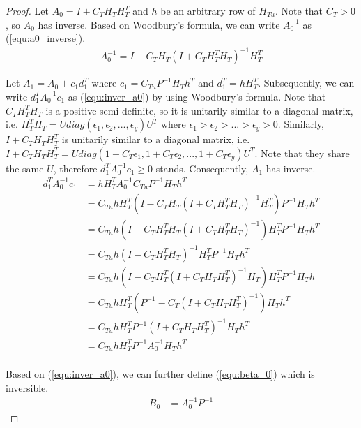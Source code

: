 \documentclass{standalone}
\begin{document}
\begin{proof}
Let $A_0=I+C_T H_T H_T^T$ and $h$ be an arbitrary row of $H_{Tu}$. Note that $C_T >0$, so $A_{0}$ has inverse. Based on Woodbury's formula, we can write $A_0^{-1}$ as (\ref{equ:a0_inverse}).
\begin{equation}
\label{equ:a0_inverse}
\begin{aligned}
A_0^{-1}=I - C_T H_T (I+ C_T H_T^T H_T)^{-1}H_T^T
\end{aligned}
\end{equation}

Let $A_1=A_0+c_1 d_1^T $ where $c_1=C_{Tu}P^{-1} H_T h^T$ and $d_1^T=h H_T^T$. Subsequently, we can write $d_1^T A_0^{-1}c_1$ as (\ref{equ:inver_a0}) by using Woodbury's formula. Note that $C_T H_T^T H_T$ is a positive semi-definite, so it is unitarily similar to a diagonal matrix, i.e. $H_T^T H_T=U diag(\epsilon_1,\epsilon_2,...,\epsilon_y) U^T$ where $\epsilon_1> \epsilon_2>...>\epsilon_y>0$. Similarly, $I+C_T H_T H_T^T$ is unitarily similar to a diagonal matrix, i.e. $I+C_T H_T H_T^T=U diag(1+C_T \epsilon_1, 1+C_T \epsilon_2,...,1+C_T \epsilon_y)U^T$. Note that they share the same $U$, therefore $d_1^T A_0^{-1}c_1 \ge 0$ stands. Consequently, $A_1$ has inverse.
\begin{equation}
\label{equ:inver_a0}
\begin{aligned}
d_1^T A_0^{-1}c_1 &= h H_T^T A_0^{-1} C_{Tu} P^{-1}H_T h^T \\
&=C_{Tu} h H_T^T (I- C_T H_T (I+ C_T H_T^T H_T)^{-1} H_T^T)  P^{-1} H_T h^T \\
&=C_{Tu} h(I-C_T H_T^T H_T (I+ C_T H_T^T H_T)^{-1})H_T^T P^{-1}H_T h^T \\
&=C_{Tu} h (I-C_T H_T^T H_T)^{-1} H_T^T P^{-1}H_T h^T \\
&=C_{Tu} h (I-C_T H_T^T (I+C_T H_T H_T^T)^{-1} H_T)H_T^T P^{-1} H_T h \\
&=C_{Tu} h H_T^T (P^{-1}-C_T (I+ C_T H_T H_T^T)^{-1})H_T h^T \\
&=C_{Tu} h H_T^T P^{-1}(I+C_T H_T H_T^T)^{-1}H_Th^T \\
&=C_{Tu} h H_T^T P^{-1} A_0^{-1} H_T h^T \\
\end{aligned}
\end{equation}

Based on (\ref{equ:inver_a0}), we can further define (\ref{equ:beta_0}) which is inversible.
\begin{equation}
\label{equ:beta_0}
\begin{aligned}
B_0 &= A_0^{-1} P^{-1}
\end{aligned}
\end{equation}


\end{proof}
\end{document}
